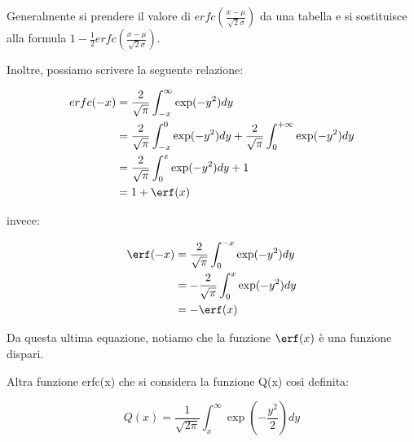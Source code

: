 Generalmente si prendere il valore di $erfc(\frac{x - \mu}{\sqrt{2} \sigma})$ da una tabella e 
si sostituisce alla formula $ 1 - \frac{1}{2} erfc(\frac{x - \mu}{\sqrt{2} \sigma})$. \newline 


Inoltre, possiamo scrivere la seguente relazione: 

{
    \Large 
    \begin{equation}
        \begin{split}
            erfc(-x) 
            &=
            \frac{2}{\sqrt{\pi}}
            \int_{-x}^{\infty}
            \exp(-y^{2}) dy
            \\ 
            &=
            \frac{2}{\sqrt{\pi}}
            \int_{-x}^{0}
            \exp(-y^{2}) dy 
            + 
            \frac{2}{\sqrt{\pi}}
            \int_{0}^{+ \infty}
            \exp(-y^{2}) dy  
            \\ 
            &= 
            \frac{2}{\sqrt{\pi}}
            \int_{0}^{x}
            \exp(-y^{2}) dy
            + 
            1 
            \\ 
            &=
            1 + \erf(x)    
        \end{split}
    \end{equation}
}

invece: 

{
    \Large 
    \begin{equation}
        \begin{split}
            \erf(-x) 
            &= 
            \frac{2}{\sqrt{\pi}} 
            \int_{0}^{-x} 
            \exp(- y^{2}) dy
            \\ 
            &= 
            -\frac{2}{\sqrt{\pi}} 
            \int_{0}^{x} 
            \exp(- y^{2}) dy 
            \\ 
            &=
            - \erf(x)
        \end{split}
    \end{equation}
}

Da questa ultima equazione, notiamo che la funzione $\erf(x)$ è una funzione dispari. \newline 

Altra funzione erfc(x) che si considera la funzione Q(x) così definita: 

{
    \Large 
    \begin{equation}
        Q(x) = \frac{1}{\sqrt{2 \pi}} 
        \int_{x}^{\infty}
        \exp(- \frac{y^{2}}{2}) 
        dy
    \end{equation}
}

